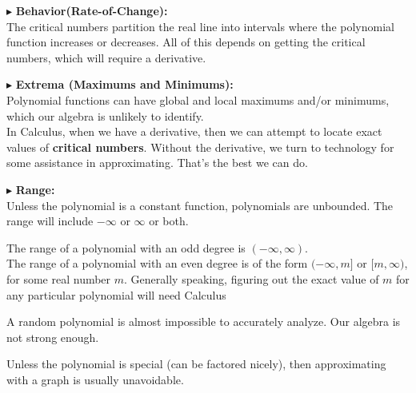 \documentclass{ximera}
\begin{document}
$\blacktriangleright$ \textbf{\textcolor{red!10!blue!90!}{Behavior(Rate-of-Change):}} \\ 
The critical numbers partition the real line into intervals where the polynomial function increases or decreases.  All of this depends on getting the critical numbers, which will require a derivative.










$\blacktriangleright$  \textbf{\textcolor{red!10!blue!90!}{Extrema (Maximums and Minimums):}} \\ 
Polynomial functions can have global and local maximums and/or minimums, which our algebra is unlikely to identify. \\

 In Calculus, when we have a derivative, then we can attempt to locate exact values of \textbf{critical numbers}.  Without the derivative, we turn to technology for some assistance in approximating.  That's the best we can do.






$\blacktriangleright$  \textbf{\textcolor{red!10!blue!90!}{Range:}} \\ 

Unless the polynomial is a constant function, polynomials are unbounded.  The range will include $-\infty$ or $\infty$ or both.  

The range of a polynomial with an odd degree is $(-\infty, \infty)$. \\


The range of a polynomial with an even degree is of the form $(-\infty, m]$ or $[m, \infty)$, for some real number $m$.  Generally speaking, figuring out the exact value of $m$ for any particular polynomial will need Calculus\\










\begin{center}

A random polynomial is almost impossible to accurately analyze. Our algebra is not strong enough.


Unless the polynomial is special (can be factored nicely), then approximating with a graph is usually unavoidable.

\end{center}
\end{document}
